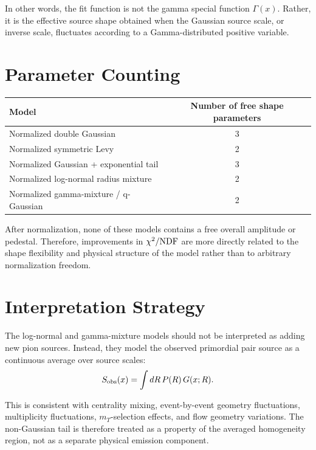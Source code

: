 \documentclass[11pt]{article}
\begin{document}
In other words, the fit function is not the gamma special function
\(\Gamma(x)\). Rather, it is the effective source shape obtained when the
Gaussian source scale, or inverse scale, fluctuates according to a
Gamma-distributed positive variable.

\section*{Parameter Counting}

\begin{center}
\begin{tabular}{lc}
\toprule
Model & Number of free shape parameters \\
\midrule
Normalized double Gaussian & 3 \\
Normalized symmetric Levy & 2 \\
Normalized Gaussian + exponential tail & 3 \\
Normalized log-normal radius mixture & 2 \\
Normalized gamma-mixture / q-Gaussian & 2 \\
\bottomrule
\end{tabular}
\end{center}

After normalization, none of these models contains a free overall amplitude or
pedestal. Therefore, improvements in \(\chi^2/{\rm NDF}\) are more directly
related to the shape flexibility and physical structure of the model rather
than to arbitrary normalization freedom.

\section*{Interpretation Strategy}

The log-normal and gamma-mixture models should not be interpreted as adding
new pion sources. Instead, they model the observed primordial pair source as a
continuous average over source scales:
\begin{equation}
  S_{\rm obs}(x)
  =
  \int dR\,P(R)\,G(x;R).
\end{equation}

This is consistent with centrality mixing, event-by-event geometry
fluctuations, multiplicity fluctuations, \(m_T\)-selection effects, and flow
geometry variations. The non-Gaussian tail is therefore treated as a property
of the averaged homogeneity region, not as a separate physical emission
component.
\end{document}

